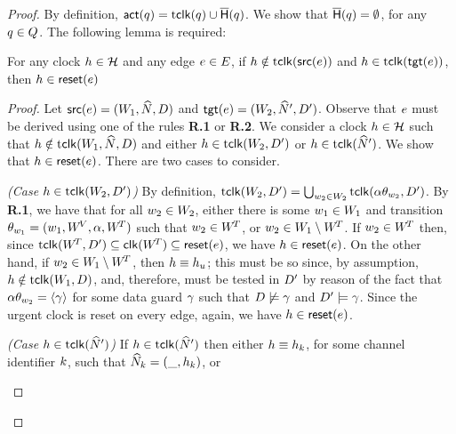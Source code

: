 \begin{proof}
By definition, ${\mathop{\sf act}}(q) = {\mathop{\mathrm{t}{\sf clk}}}(q) \cup \mathop{\overline{\sf H}}(q)$.  We show
that $\mathop{\overline{\sf H}}(q) = \emptyset$, for any $q \in Q$.  
The following lemma is required: 
\begin{lemma}
For any clock $\clock \in \clocks$ and any edge $e \in E$, if
$h \notin {\mathop{\mathrm{t}{\sf clk}}}(\mathop{\sf src}(e))$ and 
$h \in {\mathop{\mathrm{t}{\sf clk}}}(\mathop{\sf tgt}(e))$, then $h \in \mathop{\sf reset}(e)$
\end{lemma}
\begin{proof}
Let $\mathop{\sf src}(e) = (W_1,{\widehat{N}},{D})$ and $\mathop{\sf tgt}(e) =
(W_2,{\widehat{N}}',{D}')$. Observe that $e$ must be derived using one of the rules
\textbf{R.1} or \textbf{R.2}. We consider a clock $\clock \in
\clocks$ such that $h \notin {\mathop{\mathrm{t}{\sf clk}}}(W_1,{\widehat{N}},{D})$ and either $h \in
{\mathop{\mathrm{t}{\sf clk}}}(W_2,{D}')$ or $h \in {\mathop{\mathrm{t}{\sf clk}}}({\widehat{N}}')$. We show that 
$h \in \mathop{\sf reset}(e)$. There are two cases to consider.
\begin{trivlist}
\item[\it (Case $h \in {\mathop{\mathrm{t}{\sf clk}}}(W_2,{D}')$)]  
By definition, ${\mathop{\mathrm{t}{\sf clk}}}(W_2,{D}') = \bigcup_{{w}_2 \in
W_2} {\mathop{\mathrm{t}{\sf clk}}}(\alpha\theta_{{w}_2},{D}')$.  By \textbf{R.1}, we have that for all 
${w}_2 \in W_2$, either there is some ${w}_1 \in W_1$ and transition
$\theta_{{w}_1} = ({w}_1,W^{\!V},\alpha,W^{\!T})$ such that ${w}_2 \in W^{\!T}$, or
${w}_2 \in W_1 \setminus W^{\!T}$.  If ${w}_2 \in W^{\!T}$ then, since
${\mathop{\mathrm{t}{\sf clk}}}(W^{\!T} ,{D}') \subseteq {\mathop{\sf clk}}(W^{\!T}) \subseteq \mathop{\sf reset}(e)$, we
have $h \in \mathop{\sf reset}(e)$.
On the other hand, if ${w}_2 \in W_1 \setminus W^{\!T}$, then $h
\equiv h_{u}$; this must be so since, by assumption, $h \notin
{\mathop{\mathrm{t}{\sf clk}}}(W_1,{D})$, and, therefore, must be tested in ${D}'$ by reason of the fact
that $\alpha\theta_{{w}_2} = {\langle \gamma\rangle}$ for some data guard $\gamma$ such that
${D} \not\models \gamma$ and ${D}' \models \gamma$. Since the urgent clock 
is reset on every edge, again, we have $h \in \mathop{\sf reset}(e)$.
\item[\it (Case $h \in {\mathop{\mathrm{t}{\sf clk}}}({\widehat{N}}')$)] If $h \in {\mathop{\mathrm{t}{\sf clk}}}({\widehat{N}}')$ then 
either $h \equiv h_{k}$, for some
channel identifier ${k}$, such that ${\widehat{N}}_{k} = (\_,h_{k})$, or 

\end{trivlist}
\end{proof}
\end{proof}

